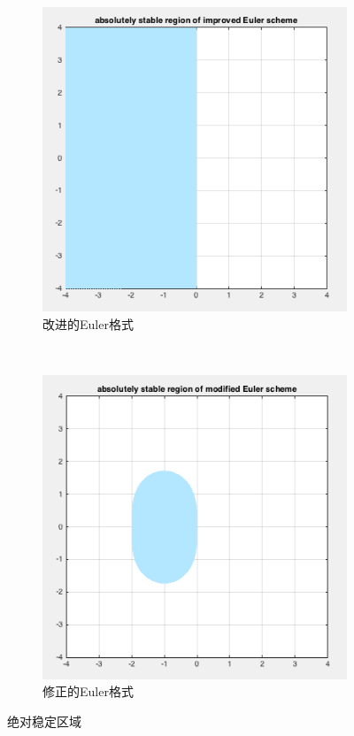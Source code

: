 \documentclass{homework}
\begin{document}
\begin{figure}[H]
    \hspace{-1em}
    \begin{subfigure}[t]{0.5\textwidth}
        \centering
        \includegraphics[width=\textwidth]{ASR-imprv.png}
        \caption{改进的Euler格式}
        \label{fig:imprv}
    \end{subfigure}~
    \begin{subfigure}[t]{0.5\textwidth}
        \centering
        \includegraphics[width=\textwidth]{ASR-modfy.png}
        \caption{修正的Euler格式}
        \label{fig:modfy}
    \end{subfigure}
    \caption{绝对稳定区域}
    \label{ASR}
\end{figure}
\end{document}
